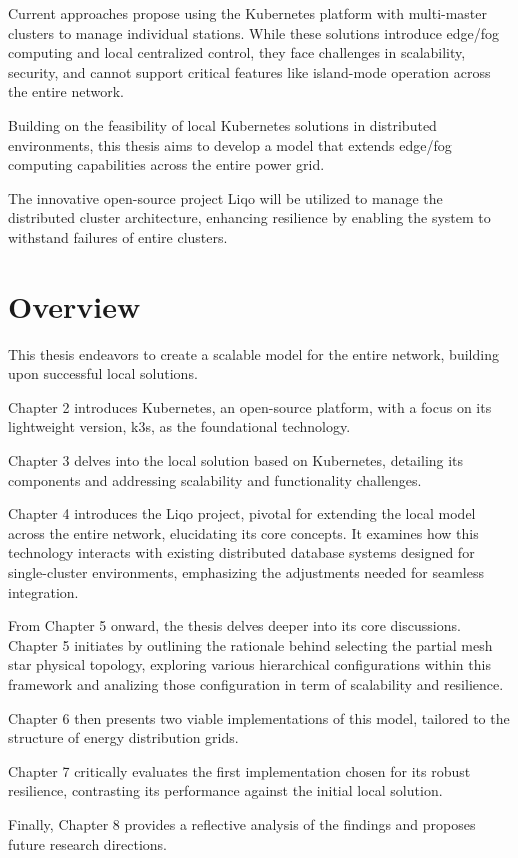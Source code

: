 Current approaches propose using the Kubernetes platform with multi-master clusters to manage individual stations. While these solutions introduce edge/fog computing and local centralized control, they face challenges in scalability, security, and cannot support critical features like island-mode operation across the entire network.

Building on the feasibility of local Kubernetes solutions in distributed environments, this thesis aims to develop a model that extends edge/fog computing capabilities across the entire power grid. 

The innovative open-source project Liqo will be utilized to manage the distributed cluster architecture, enhancing resilience by enabling the system to withstand failures of entire clusters.

\section{Overview}
This thesis endeavors to create a scalable model for the entire network, building upon successful local solutions.

\noindent Chapter 2 introduces Kubernetes, an open-source platform, with a focus on its lightweight version, k3s, as the foundational technology. 

\noindent Chapter 3 delves into the local solution based on Kubernetes, detailing its components and addressing scalability and functionality challenges.

\noindent Chapter 4 introduces the Liqo project, pivotal for extending the local model across the entire network, elucidating its core concepts. It examines how this technology interacts with existing distributed database systems designed for single-cluster environments, emphasizing the adjustments needed for seamless integration.

\noindent From Chapter 5 onward, the thesis delves deeper into its core discussions. Chapter 5 initiates by outlining the rationale behind selecting the partial mesh star physical topology, exploring various hierarchical configurations within this framework and analizing those configuration in term of scalability and resilience. 

\noindent Chapter 6 then presents two viable implementations of this model, tailored to the structure of energy distribution grids.

\noindent Chapter 7 critically evaluates the first implementation chosen for its robust resilience, contrasting its performance against the initial local solution. 

\noindent Finally, Chapter 8 provides a reflective analysis of the findings and proposes future research directions.









